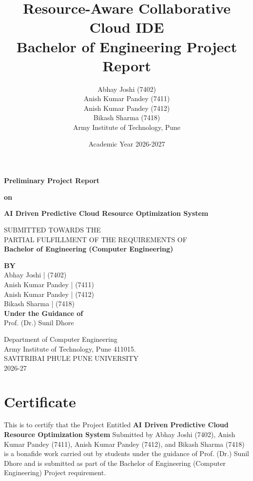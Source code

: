 \documentclass[12pt,a4paper]{report}
\title{Resource-Aware Collaborative Cloud IDE\\
\large Bachelor of Engineering Project Report}
\author{Abhay Joshi (7402) \\ Anish Kumar Pandey (7411) \\ Anish Kumar Pandey (7412) \\ Bikash Sharma (7418) \\ Army Institute of Technology, Pune}
\date{Academic Year 2026-2027}
\begin{document}
\begin{titlepage}
    \begin{center}
        \vspace*{1cm}
        
        \Large
        \textbf{Preliminary Project Report}
        
        \vspace{0.5cm}
        \textbf{on}
        \vspace{0.5cm}
        
        \huge
        \textbf{AI Driven Predictive Cloud Resource Optimization System}
        
        \vspace{1.5cm}
        
        \normalsize
        SUBMITTED TOWARDS THE \\
        PARTIAL FULFILLMENT OF THE REQUIREMENTS OF \\
        \textbf{Bachelor of Engineering (Computer Engineering)}
        
        \vspace{1.5cm}
        
        \textbf{BY} \\
        \vspace{0.5cm}
        Abhay Joshi | (7402) \\
        Anish Kumar Pandey | (7411) \\
        Anish Kumar Pandey | (7412) \\
        Bikash Sharma | (7418) \\
        
        \vspace{1.5cm}
        \textbf{Under the Guidance of} \\
        Prof. (Dr.) Sunil Dhore
        
        \vfill
        
        \vspace{0.8cm}
        \Large
        Department of Computer Engineering \\
        Army Institute of Technology, Pune 411015. \\
        SAVITRIBAI PHULE PUNE UNIVERSITY \\
        2026-27
        
    \end{center}
\end{titlepage}

\chapter*{Certificate}
This is to certify that the Project Entitled \textbf{AI Driven Predictive Cloud Resource Optimization System} Submitted by Abhay Joshi (7402), Anish Kumar Pandey (7411), Anish Kumar Pandey (7412), and Bikash Sharma (7418) is a bonafide work carried out by students under the guidance of Prof. (Dr.) Sunil Dhore and is submitted as part of the Bachelor of Engineering (Computer Engineering) Project requirement.
\end{document}
